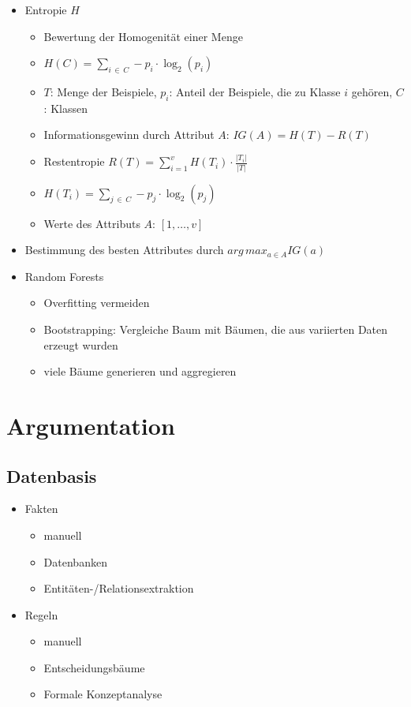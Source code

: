\documentclass[nonacm=true, language=german]{acmart}
\begin{document}
\begin{itemize}
    \item \label{entropy} Entropie $H$
    \begin{itemize}
        \item Bewertung der Homogenität einer Menge
        \item $ H(C) = \displaystyle \sum_{i \, \in \, C} -p_i \cdot \log_2(p_i) $
        \item $T$: Menge der Beispiele, $p_i$: Anteil der Beispiele, die zu Klasse $i$ gehören, $C$: Klassen
        \item Informationsgewinn durch Attribut $A$: $ IG(A) = H(T) - R(T) $
        \item Restentropie $ R(T) = \displaystyle \sum _{i=1}^v H(T_i) \cdot \frac{|T_i|}{|T|} $
        \item $ \displaystyle H(T_i) = \sum_{j \, \in \, C} -p_j \cdot \log_2(p_j) $
        \item Werte des Attributs $A$: $[1,\dots, v]$
    \end{itemize}
    
    \item Bestimmung des besten Attributes durch $arg \, max_{a \in A}IG(a) $
    
    \item Random Forests
    \begin{itemize}
        \item Overfitting vermeiden
        \item Bootstrapping: Vergleiche Baum mit Bäumen, die aus variierten Daten erzeugt wurden
        \item viele Bäume generieren und aggregieren    
    \end{itemize}
\end{itemize}

\newpage
\section{Argumentation}

\subsection{Datenbasis}

\begin{itemize}
    \item Fakten
    \begin{itemize}
        \item manuell
        \item Datenbanken
        \item Entitäten-/Relationsextraktion
    \end{itemize}
    
    \item Regeln
    \begin{itemize}
        \item manuell
        \item Entscheidungsbäume
        \item Formale Konzeptanalyse
    \end{itemize}
\end{itemize}
\end{document}
